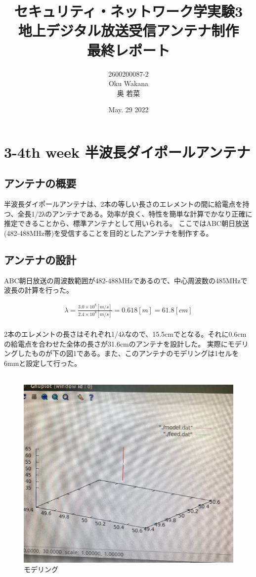 \documentclass[dvipdfmx,autodetect-engine,titlepage]{jsarticle}
\title{セキュリティ・ネットワーク学実験3\\
地上デジタル放送受信アンテナ制作\\
最終レポート
}
\author{2600200087-2\\Oku Wakana\\奥 若菜}
\date{May. 29 2022}
\begin{document}
\maketitle

\section{3-4th week 半波長ダイポールアンテナ}
\subsection{アンテナの概要}
半波長ダイポールアンテナは、2本の等しい長さのエレメントの間に給電点を持つ、全長1/2λのアンテナである。効率が良く、特性を簡単な計算でかなり正確に推定できることから、標準アンテナとして用いられる。
ここではABC朝日放送(482-488MHz帯)を受信することを目的としたアンテナを制作する。\\

\subsection{アンテナの設計}
ABC朝日放送の周波数範囲が482-488MHzであるので、中心周波数の485MHzで波長の計算を行った。

\begin{eqnarray*}
  \lambda = \frac{3.0 \times 10^8 [m/s]}{2.4 \times 10^8 [m/s]} = 0.618[m] = 61.8[cm]\\
\end{eqnarray*}

2本のエレメントの長さはそれぞれ1/4λなので、15.5cmでとなる。それに0.6cmの給電点を合わせた全体の長さが31.6cmのアンテナを設計した。
実際にモデリングしたものが下の図1である。また、このアンテナのモデリングは1セルを6mmと設定して行った。\\\\

\begin{figure}[H]
  \centering
  \includegraphics[scale=0.4]{fg1.png}
  \caption{モデリング}\label{fig:図1}
\end{figure}
\end{document}
